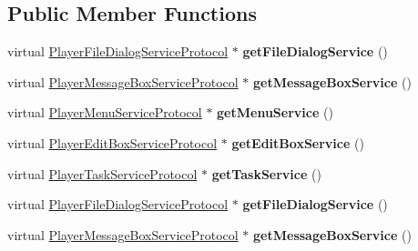 \subsection*{Public Member Functions}
\begin{DoxyCompactItemize}
\item 
\mbox{\label{classPlayerWin_aac21154c1a572a4c40c7be7eb02aeea5}} 
virtual \hyperlink{classPlayerFileDialogServiceProtocol}{Player\+File\+Dialog\+Service\+Protocol} $\ast$ {\bfseries get\+File\+Dialog\+Service} ()
\item 
\mbox{\label{classPlayerWin_a0cec5d40019bb7eeb7c4c292c9297c62}} 
virtual \hyperlink{classPlayerMessageBoxServiceProtocol}{Player\+Message\+Box\+Service\+Protocol} $\ast$ {\bfseries get\+Message\+Box\+Service} ()
\item 
\mbox{\label{classPlayerWin_a2c05f0d3ba6d036a6eb6657701db850f}} 
virtual \hyperlink{classPlayerMenuServiceProtocol}{Player\+Menu\+Service\+Protocol} $\ast$ {\bfseries get\+Menu\+Service} ()
\item 
\mbox{\label{classPlayerWin_af4696c6fa2929de63b62a533d2562e54}} 
virtual \hyperlink{classPlayerEditBoxServiceProtocol}{Player\+Edit\+Box\+Service\+Protocol} $\ast$ {\bfseries get\+Edit\+Box\+Service} ()
\item 
\mbox{\label{classPlayerWin_a4365eecaa08dacd42b41dac0fe01a5e3}} 
virtual \hyperlink{classPlayerTaskServiceProtocol}{Player\+Task\+Service\+Protocol} $\ast$ {\bfseries get\+Task\+Service} ()
\item 
\mbox{\label{classPlayerWin_abf4174eed34cb50cc3fad14ecb1d30b8}} 
virtual \hyperlink{classPlayerFileDialogServiceProtocol}{Player\+File\+Dialog\+Service\+Protocol} $\ast$ {\bfseries get\+File\+Dialog\+Service} ()
\item 
\mbox{\label{classPlayerWin_a58f4ed6c29382d846baccf43ec89747f}} 
virtual \hyperlink{classPlayerMessageBoxServiceProtocol}{Player\+Message\+Box\+Service\+Protocol} $\ast$ {\bfseries get\+Message\+Box\+Service} ()
\item 
\mbox{\label{classPlayerWin_acd72f987f0e3f8268e78fd40a08d6216}} 

\end{DoxyCompactItemize}
